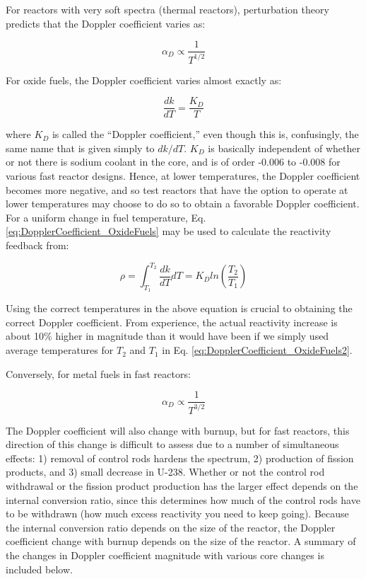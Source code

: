 \documentclass[10pt]{article}
\begin{document}
\begin{flushleft}
For reactors with very soft spectra (thermal reactors), perturbation theory predicts that the Doppler coefficient varies as:

\begin{equation}
\label{eq:DopplerCoefficient_Thermal}
\alpha_D\propto \frac{1}{T^{1/2}}
\end{equation}

For oxide fuels, the Doppler coefficient varies almost exactly as:

\begin{equation}
\label{eq:DopplerCoefficient_OxideFuels}
\frac{dk}{dT}=\frac{K_D}{T}
\end{equation}

where \(K_D\) is called the ``Doppler coefficient,'' even though this is, confusingly, the same name that is given simply to \(dk/dT\). \(K_D\) is basically independent of whether or not there is sodium coolant in the core, and is of order -0.006 to -0.008 for various fast reactor designs. Hence, at lower temperatures, the Doppler coefficient becomes more negative, and so test reactors that have the option to operate at lower temperatures may choose to do so to obtain a favorable Doppler coefficient. For a uniform change in fuel temperature, Eq. \ref{eq:DopplerCoefficient_OxideFuels} may be used to calculate the reactivity feedback from:

\begin{equation}
\label{eq:DopplerCoefficient_OxideFuels2}
\rho=\int_{T_1}^{T_2}\frac{dk}{dT}dT=K_D ln\left(\frac{T_2}{T_1}\right)
\end{equation}

Using the correct temperatures in the above equation is crucial to obtaining the correct Doppler coefficient. From experience, the actual reactivity increase is about 10\% higher in magnitude than it would have been if we simply used average temperatures for \(T_2\) and \(T_1\) in Eq. \ref{eq:DopplerCoefficient_OxideFuels2}. 

Conversely, for metal fuels in fast reactors:

\begin{equation}
\label{eq:DopplerCoefficient_Metal}
\alpha_D\propto \frac{1}{T^{3/2}}
\end{equation}

The Doppler coefficient will also change with burnup, but for fast reactors, this direction of this change is difficult to assess due to a number of simultaneous effects: 1) removal of control rods hardens the spectrum, 2) production of fission products, and 3) small decrease in U-238. Whether or not the control rod withdrawal or the fission product production has the larger effect depends on the internal conversion ratio, since this determines how much of the control rods have to be withdrawn (how much excess reactivity you need to keep going). Because the internal conversion ratio depends on the size of the reactor, the Doppler coefficient change with burnup depends on the size of the reactor. A summary of the changes in Doppler coefficient magnitude with various core changes is included below. 


\end{flushleft}
\end{document}
